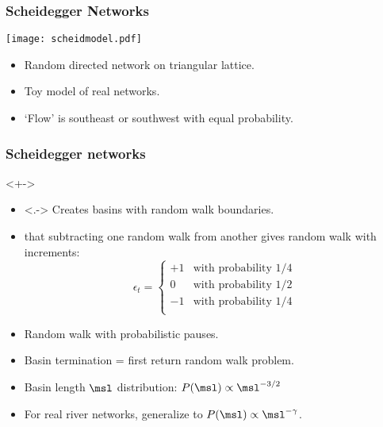 \begin{frame}
  \frametitle{Scheidegger Networks\cite{scheidegger1967b,dodds2000a}}

  \begin{block}{}
    \texttt{[image: scheidmodel.pdf]}
    \begin{itemize}
    \item 
      Random directed network on triangular lattice.
    \item 
      Toy model of real networks.
    \item 
      `Flow' is southeast or southwest with equal probability.
    \end{itemize}
  \end{block}

\end{frame}


\begin{frame}
  \frametitle{Scheidegger networks}

  \begin{block}<+->{}
  \begin{itemize}
  \item <.->
    Creates basins with random walk boundaries.
  \item <+->
     that subtracting one random walk from another
    gives random walk with increments:
    $$
    \epsilon_t = 
    \left\{
      \begin{array}{cl}
        +1 & \mbox{with probability $1/4$} \\
        0 & \mbox{with probability $1/2$} \\
        -1 & \mbox{with probability $1/4$} \\
      \end{array}
    \right.
    $$
  \item <+->
    Random walk with probabilistic pauses.
  \item <+->
    Basin termination = first return random walk problem.
  \item <+->
    Basin length $\msl$ distribution: $P(\msl) \propto \msl^{-3/2}$
  \item <+->
    For real river networks, generalize 
    to $P(\msl) \propto \msl^{-\gamma}$.
  \end{itemize}
  \end{block}
  
\end{frame}

